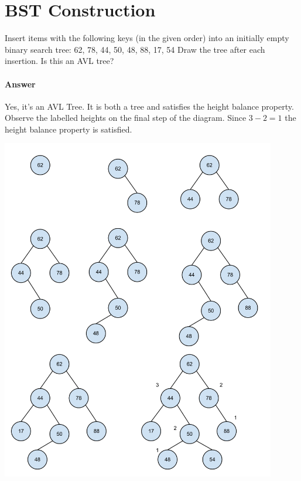 \documentclass[12pt]{article}
\begin{document}
\maketitle

\section{BST Construction}
Insert items with the following keys (in the given order) into an initially empty binary search tree: 
62, 78, 44, 50, 48, 88, 17, 54
Draw the tree after each insertion. Is this an AVL tree?

\paragraph{Answer}
Yes, it's an AVL Tree. It is both a tree and satisfies the height balance property. Observe the labelled heights on the final step of the diagram. Since $3-2=1$ the height balance property is satisfied.
\clearpage
\begin{center}
\includegraphics[width=0.9\textwidth]{figures/bst.png}
\end{center}
\end{document}
